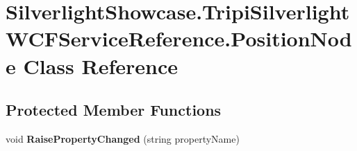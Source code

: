 \hypertarget{class_silverlight_showcase_1_1_tripi_silverlight_w_c_f_service_reference_1_1_position_node}{
\section{SilverlightShowcase.TripiSilverlightWCFServiceReference.PositionNode Class Reference}
\label{class_silverlight_showcase_1_1_tripi_silverlight_w_c_f_service_reference_1_1_position_node}
}
\subsection*{Protected Member Functions}
\begin{DoxyCompactItemize}
\item 
\hypertarget{class_silverlight_showcase_1_1_tripi_silverlight_w_c_f_service_reference_1_1_position_node_a6f62803e2bd683fd5f2b474c1ce5adae}{
void {\bfseries RaisePropertyChanged} (string propertyName)}
\label{class_silverlight_showcase_1_1_tripi_silverlight_w_c_f_service_reference_1_1_position_node_a6f62803e2bd683fd5f2b474c1ce5adae}

\end{DoxyCompactItemize}

